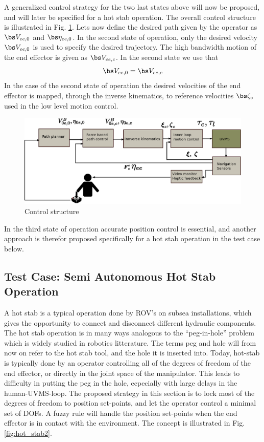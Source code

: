 A generalized control strategy for the two last states above will now  be proposed, and will later be specified for a hot stab operation. The overall control structure is illustrated in Fig. \ref{fig:control_structure}. Lets now define the desired path given by the operator as $\bs V_{ee,0}$ and $\bs \eta_{ee,0}$. In the second state of operation, only the desired velocity $\bs V_{ee,0}$ is used to specify the desired trajectory. The high bandwidth motion of the end effector is given as $\bs V_{ee,c}$. In the second state we use that 
$$\bs V_{ee,0} = \bs V_{ee,c} $$ 
In the case of the second state of operation the desired velocities of the end effector is mapped, through the inverse kinematics, to reference velocities $\bs \zeta_{c}$ used in the low level motion control.
\begin{figure}[h!]
	\centering
	\includegraphics[scale=0.9]{./figures/control_structure.eps}
	\caption{Control structure}
	\label{fig:control_structure}
\end{figure}
In the third state of operation accurate position control is essential, and another approach is therefor proposed specifically for a hot stab operation in the test case below. 

\subsection{Test Case: Semi Autonomous Hot Stab Operation}
A hot stab is a typical operation done by ROV's on subsea installations, which gives the opportunity to connect and disconnect different hydraulic components. 
The hot stab operation is in many ways analogous to the ``peg-in-hole'' problem which is widely studied in robotics litterature. The terms peg and hole will from now on refer to the hot stab tool, and the hole it is inserted into. 
Today, hot-stab is typically done by an operator controlling all of the degrees of freedom of the end effector, or directly in the joint space of the manipulator. This leads to difficulty in putting the peg in the hole, ecpecially 
with large delays in the human-UVMS-loop. 
The proposed strategy in this section is to lock most of the degrees of freedom to position set-points, and let the operator control a minimal set of DOFs. A fuzzy rule will handle the position set-points when the end effector is in 
contact with the environment. The concept is illustrated in Fig. \ref{fig:hot_stab2}.


